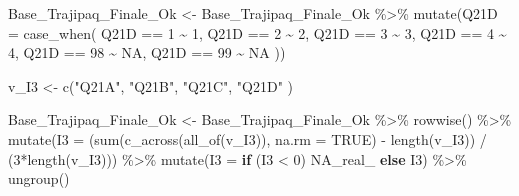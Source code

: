 \documentclass[
]{article}
\newenvironment{Shaded}{\begin{snugshade}}{\end{snugshade}}
\newcommand{\AttributeTok}[1]{\textcolor[rgb]{0.77,0.63,0.00}{#1}}
\newcommand{\ConstantTok}[1]{\textcolor[rgb]{0.00,0.00,0.00}{#1}}
\newcommand{\ControlFlowTok}[1]{\textcolor[rgb]{0.13,0.29,0.53}{\textbf{#1}}}
\newcommand{\DecValTok}[1]{\textcolor[rgb]{0.00,0.00,0.81}{#1}}
\newcommand{\FunctionTok}[1]{\textcolor[rgb]{0.00,0.00,0.00}{#1}}
\newcommand{\NormalTok}[1]{#1}
\newcommand{\OtherTok}[1]{\textcolor[rgb]{0.56,0.35,0.01}{#1}}
\newcommand{\SpecialCharTok}[1]{\textcolor[rgb]{0.00,0.00,0.00}{#1}}
\newcommand{\StringTok}[1]{\textcolor[rgb]{0.31,0.60,0.02}{#1}}
\begin{document}
\begin{Shaded}
\begin{Highlighting}[]
\NormalTok{Base\_Trajipaq\_Finale\_Ok }\OtherTok{\textless{}{-}}
\NormalTok{  Base\_Trajipaq\_Finale\_Ok }\SpecialCharTok{\%\textgreater{}\%}
  \FunctionTok{mutate}\NormalTok{(}\AttributeTok{Q21D =} \FunctionTok{case\_when}\NormalTok{(}
\NormalTok{    Q21D }\SpecialCharTok{==} \DecValTok{1} \SpecialCharTok{\textasciitilde{}} \DecValTok{1}\NormalTok{,}
\NormalTok{    Q21D }\SpecialCharTok{==} \DecValTok{2} \SpecialCharTok{\textasciitilde{}} \DecValTok{2}\NormalTok{,}
\NormalTok{    Q21D }\SpecialCharTok{==} \DecValTok{3} \SpecialCharTok{\textasciitilde{}} \DecValTok{3}\NormalTok{,}
\NormalTok{    Q21D }\SpecialCharTok{==} \DecValTok{4} \SpecialCharTok{\textasciitilde{}} \DecValTok{4}\NormalTok{,}
\NormalTok{    Q21D }\SpecialCharTok{==} \DecValTok{98} \SpecialCharTok{\textasciitilde{}} \ConstantTok{NA}\NormalTok{,}
\NormalTok{    Q21D }\SpecialCharTok{==} \DecValTok{99} \SpecialCharTok{\textasciitilde{}} \ConstantTok{NA}
\NormalTok{  ))}
\end{Highlighting}
\end{Shaded}

\begin{Shaded}
\begin{Highlighting}[]
\NormalTok{v\_I3 }\OtherTok{\textless{}{-}} \FunctionTok{c}\NormalTok{(}\StringTok{"Q21A"}\NormalTok{,}
          \StringTok{"Q21B"}\NormalTok{,}
          \StringTok{"Q21C"}\NormalTok{,}
          \StringTok{"Q21D"}
\NormalTok{          )}

\NormalTok{Base\_Trajipaq\_Finale\_Ok }\OtherTok{\textless{}{-}}
\NormalTok{  Base\_Trajipaq\_Finale\_Ok }\SpecialCharTok{\%\textgreater{}\%}
  \FunctionTok{rowwise}\NormalTok{() }\SpecialCharTok{\%\textgreater{}\%}
  \FunctionTok{mutate}\NormalTok{(}\AttributeTok{I3 =}\NormalTok{ (}\FunctionTok{sum}\NormalTok{(}\FunctionTok{c\_across}\NormalTok{(}\FunctionTok{all\_of}\NormalTok{(v\_I3)), }\AttributeTok{na.rm =} \ConstantTok{TRUE}\NormalTok{) }\SpecialCharTok{{-}} \FunctionTok{length}\NormalTok{(v\_I3)) }\SpecialCharTok{/}\NormalTok{ (}\DecValTok{3}\SpecialCharTok{*}\FunctionTok{length}\NormalTok{(v\_I3))) }\SpecialCharTok{\%\textgreater{}\%}
  \FunctionTok{mutate}\NormalTok{(}\AttributeTok{I3 =} \ControlFlowTok{if}\NormalTok{ (I3 }\SpecialCharTok{\textless{}} \DecValTok{0}\NormalTok{) }\ConstantTok{NA\_real\_} \ControlFlowTok{else}\NormalTok{ I3) }\SpecialCharTok{\%\textgreater{}\%}
  \FunctionTok{ungroup}\NormalTok{()}
\end{Highlighting}
\end{Shaded}

\begin{Shaded}
\end{Shaded}
\end{document}
